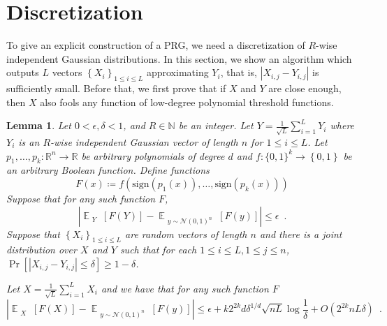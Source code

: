\documentclass[12pt]{article}
\newtheorem{lemma}[theorem]{Lemma}
\newcommand{\N}{\mathbb{N}}  \newcommand{\R}{\mathbb{R}} \newcommand{\C}{\mathbb{C}} \newcommand{\U}{\mathbb{U}} \renewcommand{\d}{\mathrm{d}} \DeclareMathOperator*{\E}{\mathbb{E}}  \newcommand{\so}{\mathrm{SO}} \newcommand{\s}{\mathrm{S}} \newcommand{\su}{\mathrm{SU}} \renewcommand{\i}{\mathrm{i}} \newcommand{\A}{\mathcal{A}}  \newcommand{\B}{\mathcal{B}} \newcommand{\CC}{\mathcal{C}} \newcommand{\D}{\mathcal{D}} \newcommand{\F}{\mathcal{F}} \renewcommand{\H}{\mathcal{H}} \newcommand{\K}{\mathcal{K}} \newcommand{\NN}{\mathcal{N}} \newcommand{\V}{\mathcal{V}} \newcommand{\X}{\mathcal{X}} \newcommand{\Y}{\mathcal{Y}} \renewcommand{\S}{\mathcal{S}} \newcommand{\SR}{\mathcal{S}_{\R}} \newcommand{\SC}{\mathcal{S}_{\C}} \newcommand{\EE}{\mathcal{E}}  \newcommand{\PP}{\mathcal{P}} \newcommand{\KK}{\widetilde{K}} \newcommand{\LL}{\widetilde{L}} \newcommand{\W}{\widehat{W}} \newcommand{\f}{\hat{f}} \newcommand{\g}{\hat{g}} \newcommand{\h}{\hat{h}} \newcommand{\bit}[1]{\{0,1\}^{#1}} \newcommand{\wrt}{w.r.t.~} \newcommand{\us}{\overset{\$}{\leftarrow}} \newcommand{\set}[1]{\left\{#1\right\}} \newcommand{\lhs}{\mathrm{LHS}} \newcommand{\expec}[1]{\E\!\Br{#1}} \newcommand{\expect}[2]{\E_{\substack{#1}}\!\Br{#2}} \newcommand{\prob}[2]{\underset{#1}{\mathrm{Pr}}\!\Br{#2}} \newcommand{\cf}{\widetilde{f}} \newcommand{\cg}{\widetilde{g}} \newcommand{\ch}{\widetilde{h}} \newcommand{\ck}{\widetilde{K}} \newcommand{\rep}[2]{\br{#1}_{#2}} \newcommand{\AND}[1]{\mathrm{AND}\!\br{#1}}
\newcommand{\sign}[1]{\mathrm{sign}\!\br{#1}}
\newcommand{\br}[1]{\left(#1\right)} \newcommand{\Br}[1]{\left[#1\right]} \newcommand{\st}[1]{\left\{#1\right\}} \newcommand{\tr}[1]{\mathrm{Tr}\!\Br{#1}} \newcommand{\abs}[1]{\left|#1 \right|} \newcommand{\norm}[1]{\left\lVert #1 \right\rVert} \newcommand{\agl}[2]{\theta^{\br{#1}}_{#2}} \newcommand{\aglp}[2]{{\theta'}^{\br{#1}}_{#2}} \newcommand{\lint}[1]{\left\lfloor#1\right\rfloor} \newcommand{\poly}[1]{\mathrm{poly}\!\br{#1}} \newcommand{\negl}[1]{\mathrm{negl}\!\br{#1}} \newcommand{\de}[1]{\mathrm{d}#1} \newcommand{\val}[1]{\mathrm{val}\!\br{#1}} \newcommand{\vall}[1]{\mathrm{val}\br{#1}} \newcommand{\nd}[1]{\mathcal{N}\!\br{#1}} \newcommand{\ketbratwo}[2]{\ket{#1} \hspace{-0.4em}\bra{#2}} \newcommand{\ketbra}[1]{\ketbratwo{#1}{#1}} \newcommand{\id}{\ensuremath{\mathds{1}}} \newcommand{\ogroup}[1]{\mathrm{O}\!\br{#1}} \newcommand{\ugroup}[1]{\mathrm{U}\!\br{#1}} \newcommand{\td}{\mathrm{TD}} \newcommand{\tv}[1]{\norm{#1}_{\mathrm{TV}}} \newcommand {\defeq} {\ensuremath{ \stackrel{\mathrm{def}}{=} }} \newcommand{\vdim}{\ensuremath{N}} \newcommand{\dimin}{\ensuremath{n}} \newcommand{\dimout}{\ensuremath{m}} \newcommand{\ncopy}{\ell} \newcommand{\hspacein}{\H_\mathrm{in}} \newcommand{\hspaceout}{\H_\mathrm{out}} \newcommand{\Sin}{\S(\hspacein)} \newcommand{\Sout}{\S(\hspaceout)} \newcommand{\haar}{\ensuremath{\mu}} \newcommand{\tensorhaar}{\ensuremath{\eta}} \newcommand{\tensorsrss}{\ensuremath{\nu}} \newcommand{\qadvice}{\ensuremath{\rho}} \newcommand{\tp}{\otimes} \newcommand{\wone}[2]{W_1\!\br{#1,#2}}
\begin{document}
	
	
	
	
	 

\section{Discretization}
\label{sec:discrete}
To give an explicit construction of a PRG,
we need a discretization of $R$-wise independent Gaussian distributions. 
In this section, we show an algorithm which outputs $L$ vectors $\st{X_i}_{1\leq i\leq L}$ approximating $Y_i$, that is, $\abs{X_{i,j}-Y_{i,j}}$ is sufficiently small. Before that, we first prove that if $X$ and $Y$ are close enough, then $X$ also fools any function of low-degree polynomial threshold functions.



\begin{lemma}\label{lem:discrete}
	Let $0<\epsilon,\delta<1$, and $R\in\N$ be an integer.
	Let $Y = \frac{1}{\sqrt{L}}\sum_{i=1}^L Y_i$ where $Y_i$ is an $R$-wise independent Gaussian vector of length $n$ for $1\leq i\leq L$.
	Let $p_1,\dots,p_k:\R^n \to \R$ be arbitrary polynomials of degree $d$ and $f:\bit{k}\to\st{0,1}$ be an arbitrary Boolean function.
	Define functions
	\[
		F(x)\coloneqq f\!\br{\sign{p_1\!(x)},\dots,\sign{p_k\!(x)}}
	\]
Suppose that for any such function $F$,
	\[
	\abs{
		\expect{Y}{
			F(Y)	
		}
		-
		\expect{y\sim\NN\br{0,1}^n}{
			F(y)
		}
	} \leq \epsilon \enspace .
	\]
	Suppose that $\st{X_{i}}_{1\leq i\leq L}$ are random vectors of length $n$ and there is a joint distribution over $X$ and $Y$ such that
	for each $1\leq i\leq L,1\leq j\leq n$, 
	$\Pr\Br{\abs{X_{i,j}-Y_{i,j}}\leq \delta}\geq 1-\delta$.
	
	Let $X = \frac{1}{\sqrt{L}}\sum_{i=1}^L X_i$ and we have that for any such function $F$
	\[
	\abs{
		\expect{X}{
			F(X)	
		}
		-
		\expect{y\sim\NN\br{0,1}^n}{
			F(y)
		}
	} \leq \epsilon + k 2^{2k}d \delta^{1/d} \sqrt{nL} \log\frac{1}{\delta}  + O(2^{2k}nL\delta) \enspace .
	\]
\end{lemma}
\end{document}
